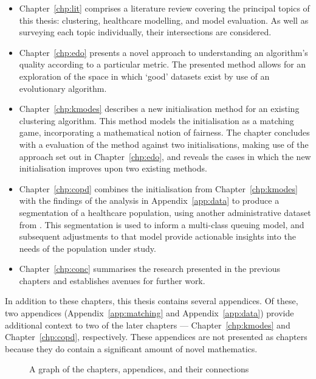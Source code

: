 \begin{itemize}
    \item Chapter~\ref{chp:lit} comprises a literature review covering the
        principal topics of this thesis: clustering, healthcare modelling, and
        model evaluation. As well as surveying each topic individually, their
        intersections are considered.
    \item Chapter~\ref{chp:edo} presents a novel approach to understanding an
        algorithm's quality according to a particular metric. The presented
        method allows for an exploration of the space in which `good' datasets
        exist by use of an evolutionary algorithm.
    \item Chapter~\ref{chp:kmodes} describes a new initialisation method for an
        existing clustering algorithm. This method models the initialisation as
        a matching game, incorporating a mathematical notion of fairness. The
        chapter concludes with a evaluation of the method against two
        initialisations, making use of the approach set out in
        Chapter~\ref{chp:edo}, and reveals the cases in which the new
        initialisation improves upon two existing methods.
    \item Chapter~\ref{chp:copd} combines the initialisation from
        Chapter~\ref{chp:kmodes} with the findings of the analysis in
        Appendix~\ref{app:data} to produce a segmentation of a healthcare
        population, using another administrative dataset from \ctmuhb. This
        segmentation is used to inform a multi-class queuing model, and
        subsequent adjustments to that model provide actionable insights into
        the needs of the population under study.
    \item Chapter~\ref{chp:conc} summarises the research presented in the
        previous chapters and establishes avenues for further work.
\end{itemize}

In addition to these chapters, this thesis contains several appendices. Of
these, two appendices (Appendix~\ref{app:matching} and Appendix~\ref{app:data})
provide additional context to two of the later chapters ---
Chapter~\ref{chp:kmodes} and Chapter~\ref{chp:copd}, respectively. These
appendices are not presented as chapters because they do contain a significant
amount of novel mathematics.

\begin{figure}[htbp]
    \centering%
    \resizebox{\imgwidth}{!}{%
        
    }
    \caption{%
        A graph of the chapters, appendices, and their connections%
    }\label{fig:structure}
\end{figure}

